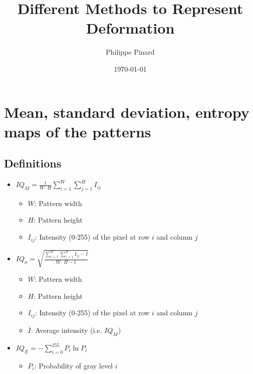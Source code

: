 \documentclass[letterpaper]{article}
\title{Different Methods to Represent Deformation}
\author{Philippe Pinard}
\date{\today}
\begin{document}
	\pagestyle{fancy}
	\fancyhf{}
	\setlength{\headheight}{15pt}
	\setlength{\headsep}{10pt}
	\rhead{\today}
	\rfoot{\thepage}
	
	\section{Mean, standard deviation, entropy maps of the patterns}
		\subsection{Definitions}
			\begin{itemize}
				\item $IQ_M = \frac{1}{W\cdot H} \sum\limits_{i=1}^{W}{\sum\limits_{j=1}^{H}{I_{ij}}}$ \cite{Tao2005,Wright2006}
					\begin{itemize}
						\item $W$: Pattern width
						\item $H$: Pattern height
						\item $I_{ij}$: Intensity (0-255) of the pixel at row $i$ and column $j$
					\end{itemize}
				\item $IQ_\sigma = \sqrt{\frac{\sum\limits_{i=1}^{W}{\sum\limits_{j=1}^{H}{I_{ij} - \bar{I}}}}{W\cdot H - 1}}$ \cite{Tao2005,Wright2006}
					\begin{itemize}
						\item $W$: Pattern width
						\item $H$: Pattern height
						\item $I_{ij}$: Intensity (0-255) of the pixel at row $i$ and column $j$
						\item $\bar{I}$: Average intensity (i.e. $IQ_M$)
					\end{itemize}
				\item $IQ_E = - \sum\limits_{i=0}^{255}{P_i\ln{P_i}}$ \cite{Tao2005,Wright2006}
					\begin{itemize}
						\item $P_i$: Probability of gray level $i$
					\end{itemize}
			\end{itemize}
		
\end{document}
